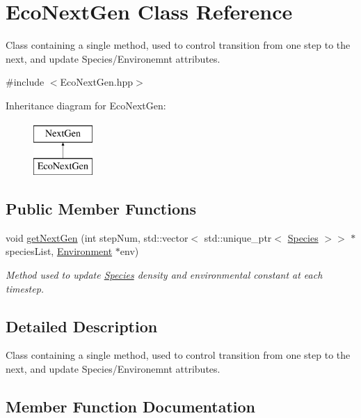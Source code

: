 \hypertarget{classEcoNextGen}{}\section{Eco\+Next\+Gen Class Reference}
\label{classEcoNextGen}


Class containing a single method, used to control transition from one step to the next, and update Species/\+Environemnt attributes.  




{\ttfamily \#include $<$Eco\+Next\+Gen.\+hpp$>$}

Inheritance diagram for Eco\+Next\+Gen\+:\begin{figure}[H]
\begin{center}
\leavevmode
\includegraphics[height=2.000000cm]{classEcoNextGen}
\end{center}
\end{figure}
\subsection*{Public Member Functions}
\begin{DoxyCompactItemize}
\item 
void \hyperlink{classEcoNextGen_a4cb2fccbd3221f41c249c97af461dd3c}{get\+Next\+Gen} (int step\+Num, std\+::vector$<$ std\+::unique\+\_\+ptr$<$ \hyperlink{classSpecies}{Species} $>$$>$ $\ast$species\+List, \hyperlink{classEnvironment}{Environment} $\ast$env)
\begin{DoxyCompactList}\small\item\em Method used to update \hyperlink{classSpecies}{Species} density and environmental constant at each timestep. \end{DoxyCompactList}\end{DoxyCompactItemize}


\subsection{Detailed Description}
Class containing a single method, used to control transition from one step to the next, and update Species/\+Environemnt attributes. 

\subsection{Member Function Documentation}
\hypertarget{classEcoNextGen_a4cb2fccbd3221f41c249c97af461dd3c}{}\label{classEcoNextGen_a4cb2fccbd3221f41c249c97af461dd3c} 
